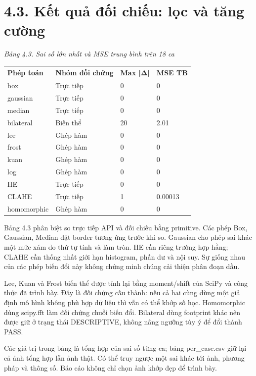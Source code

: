 \documentclass[13pt,a4paper]{extreport}
\begin{document}
\section*{4.3. Kết quả đối chiếu: lọc và tăng cường}
\noindent\textit{Bảng 4.3. Sai số lớn nhất và MSE trung bình trên 18 ca}
\begin{longtable}{p{3.65cm}|p{3.65cm}|p{3.65cm}|p{3.65cm}}
Phép toán & Nhóm đối chứng & Max |Δ| & MSE TB\\\hline
box & Trực tiếp & 0 & 0\\\hline
gaussian & Trực tiếp & 0 & 0\\\hline
median & Trực tiếp & 0 & 0\\\hline
bilateral & Biến thể & 20 & 2.01\\\hline
lee & Ghép hàm & 0 & 0\\\hline
frost & Ghép hàm & 0 & 0\\\hline
kuan & Ghép hàm & 0 & 0\\\hline
log & Ghép hàm & 0 & 0\\\hline
HE & Trực tiếp & 0 & 0\\\hline
CLAHE & Trực tiếp & 1 & 0.00013\\\hline
homomorphic & Ghép hàm & 0 & 0\\\hline
\end{longtable}
Bảng 4.3 phân biệt so trực tiếp API và đối chiếu bằng primitive. Các phép Box, Gaussian, Median đặt border tương ứng trước khi so. Gaussian cho phép sai khác một mức xám do thứ tự tính và làm tròn. HE cần riêng trường hợp hằng; CLAHE cần thống nhất giới hạn histogram, phần dư và nội suy. Sự giống nhau của các phép biến đổi này không chứng minh chúng cải thiện phân đoạn dầu.
\par
Lee, Kuan và Frost biến thể được tính lại bằng moment/shift của SciPy và công thức đã trình bày. Đây là đối chứng cấu thành: nếu cả hai cùng dùng một giả định mô hình không phù hợp dữ liệu thì vẫn có thể khớp số học. Homomorphic dùng scipy.fft làm đối chứng chuỗi biến đổi. Bilateral dùng footprint khác nên được giữ ở trạng thái DESCRIPTIVE, không nâng ngưỡng tùy ý để đổi thành PASS.
\par
Các giá trị trong bảng là tổng hợp của sai số từng ca; bảng per\_case.csv giữ lại cả ảnh tổng hợp lẫn ảnh thật. Có thể truy ngược một sai khác tới ảnh, phương pháp và thông số. Báo cáo không chỉ chọn ảnh khớp đẹp để trình bày.
\par
\clearpage
\end{document}
